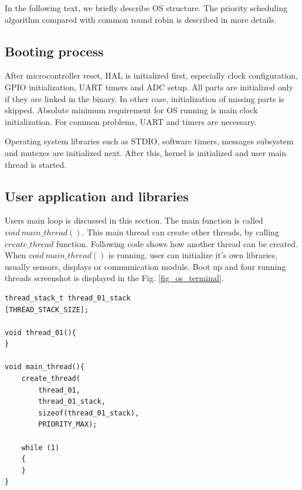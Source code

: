 \documentclass[a4paper, conference]{IEEEtran}
\begin{document}
In the following text, we briefly describe OS structure. The priority scheduling algorithm compared with common round robin is described in more details.

\subsection{Booting process}

After microcontroller reset, HAL is initialized first, especially clock configuration, GPIO initialization, UART timers and ADC setup.
All parts are initialized only if they are linked in the binary. In other case, initialization of missing parts is skipped.
Absolute minimum requirement for OS running is main clock initialization. For common problems, UART and timers are necessary.

Operating system libraries such as STDIO, software timers, messages subsystem and mutexes are initialized next.
After this, kernel is initialized and user main thread is started.

\subsection{User application and libraries}

Users main loop is discussed in this section. The main function is called $void\ main\_thread()$. This main thread can create other threads, by calling $create\_thread$ function. Following code shows how another thread can be created. When $void\ main\_thread()$ is running, user can initialize it's own libraries, usually sensors, displays or communication module. Boot up and four running threads screenshot is displayed in  the Fig. \ref{fig_os_terminal}.

\noindent\begin{minipage}{.45\textwidth}
\lstset{language=C++}
\begin{lstlisting}[frame=single, caption = Thread creating]
thread_stack_t thread_01_stack
[THREAD_STACK_SIZE];

void thread_01(){
}

void main_thread(){
    create_thread(
        thread_01,
        thread_01_stack,
        sizeof(thread_01_stack),
        PRIORITY_MAX);

    while (1)
    {
    }
}
\end{lstlisting}
\end{minipage}\hfill
\end{document}

